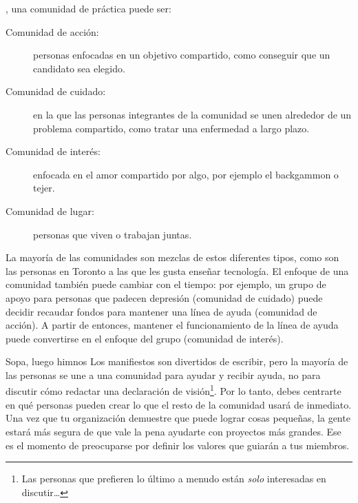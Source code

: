 ,
una comunidad de práctica puede ser:

\begin{description}

\item[Comunidad de acción:]
  personas enfocadas en un objetivo compartido,
  como conseguir que un candidato sea elegido.

\item[Comunidad de cuidado:]
 en la que las personas integrantes de la comunidad se unen alrededor de un problema compartido, como tratar una enfermedad a largo plazo.

\item[Comunidad de interés:]
  enfocada en el amor compartido por algo, por ejemplo el backgammon o tejer.

\item[Comunidad de lugar:]
  personas que viven o trabajan juntas.

\end{description}
 
La mayoría de las comunidades son mezclas de estos diferentes tipos,
como son las personas en Toronto a las que les gusta enseñar tecnología.
El enfoque de una comunidad también puede cambiar con el tiempo:
por ejemplo,
un grupo de apoyo para personas que padecen depresión (comunidad de cuidado)
puede decidir recaudar fondos para mantener una línea de ayuda (comunidad de acción).
A partir de entonces, mantener el funcionamiento de la línea de ayuda puede convertirse en el enfoque del grupo (comunidad de interés).

\begin{aside}{Sopa, luego himnos}
  Los manifiestos son divertidos de escribir,
  pero la mayoría de las personas se une a una comunidad para ayudar y recibir ayuda, no para discutir cómo redactar una declaración de visión\footnote{Las personas que prefieren lo último a menudo están \emph{solo} interesadas en discutir{\ldots}}.
  Por lo tanto, debes centrarte en
  qué personas pueden crear lo que el resto de la comunidad usará de inmediato.
  Una vez que tu organización demuestre que puede lograr cosas pequeñas,
  la gente estará más segura de que vale la pena ayudarte con proyectos más grandes.
  Ese es el momento de preocuparse por definir los valores que guiarán a tus miembros.
\end{aside}


